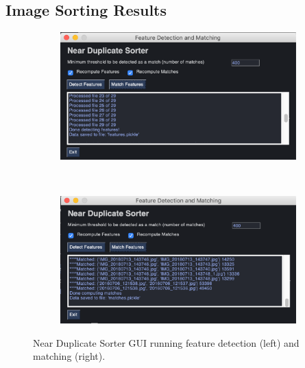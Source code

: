 \documentclass[12pt]{article}
\begin{document}
\subsection{Image Sorting Results}

\begin{figure}[H]
	\centering
	\begin{subfigure}[b]{.5\textwidth}
	\includegraphics[width=1\textwidth]{images/near_duplicate_GUI1.png}
	\end{subfigure}%
	~
	\begin{subfigure}[b]{.5\textwidth}
		\includegraphics[width=1\textwidth]{images/near_duplicate_GUI2.png}
	\end{subfigure}

	\caption{Near Duplicate Sorter GUI running feature detection (left) and matching (right).}
\end{figure}
\end{document}
